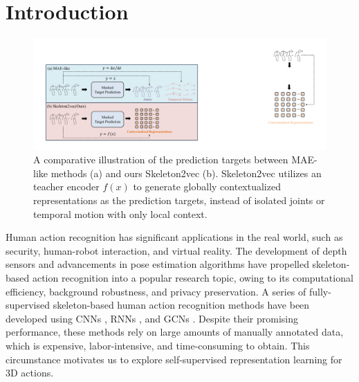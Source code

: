 \section{Introduction}
\label{sec:intro}


\begin{figure}
  \centering
  \includegraphics[width=0.80\linewidth]{figures/fig_mae_and_skeleton2vec.pdf}
    \caption{
    A comparative illustration of the prediction targets between MAE-like methods (a) and
    ours Skeleton2vec (b). Skeleton2vec utilizes an teacher encoder $f(x)$ to generate
    globally contextualized representations as the prediction targets, instead of
    isolated joints or temporal motion with only local context.
    }
    \label{fig1}
    \vspace{-10pt}
\end{figure}

Human action recognition has significant applications in the real world, such as
security, human-robot interaction, and virtual reality. The development of depth
sensors and advancements in pose estimation algorithms \cite{2018OpenPose, fang2017rmpe, xu2020deep}
have propelled skeleton-based action recognition into a popular research topic,
owing to its computational efficiency, background robustness, and privacy preservation.
A series of fully-supervised skeleton-based human action recognition methods have
been developed using CNNs \cite{du2015skeleton,li2017skeleton}, RNNs \cite{liu2016spatio,zhang2017view},
and GCNs \cite{yan2018spatial,chen2021channel}. Despite their promising performance,
these methods rely on large amounts of manually annotated data, which is expensive,
labor-intensive, and time-consuming to obtain. This circumstance motivates us
to explore self-supervised representation learning for 3D actions.

